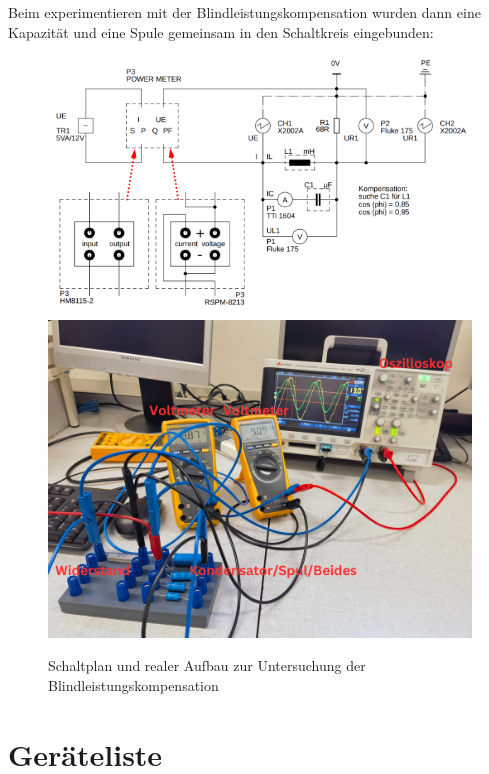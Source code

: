\documentclass[12pt,a4paper,twoside]{article}
\begin{document}
Beim experimentieren mit der Blindleistungskompensation wurden dann eine Kapazität und eine Spule gemeinsam in den Schaltkreis eingebunden:

\begin{figure}[H]
    \centering
    \includegraphics[width=0.4\linewidth]{nudes/Schaltplan7.PNG}
    \includegraphics[width=0.4\linewidth]{nudes/PhaseLeistungBilder/Aufbau5,6,7.jpg}
    \caption{Schaltplan und realer Aufbau zur Untersuchung der Blindleistungskompensation}
    \label{fig:Aufbau7}
\end{figure}



\section{Geräteliste} %

    \begin{table}[H]
        \centering
        \caption{Im Versuch verwendete Geräte und Utensilien.}
        \label{tab:geraete}
    \end{table}
\end{document}
